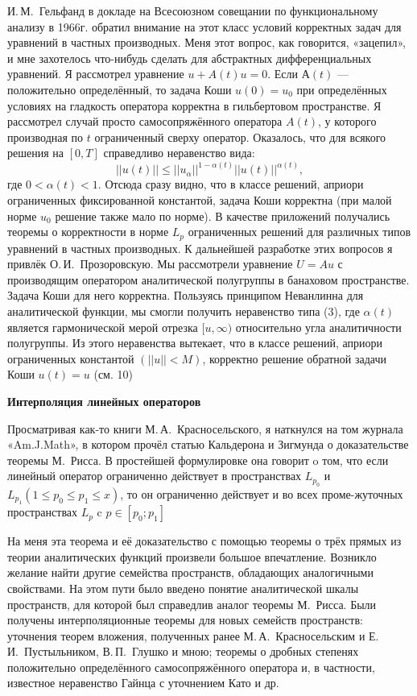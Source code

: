И.\,М.~Гельфанд в докладе на Всесоюзном совещании по функциональному анализу в 1966г. обратил внимание на этот класс условий корректных задач для уравнений в частных производных. Меня этот вопрос, как говорится, «зацепил», и мне захотелось что-нибудь сделать для абстрактных дифференциальных уравнений. Я рассмотрел уравнение $u + A(t)u = 0$. Если $А(t)$ --- положительно определённый, то задача Коши $u(0)=u_0$ при определённых условиях на гладкость оператора корректна в гильбертовом пространстве. Я рассмотрел случай просто самосопряжённого оператора $A(t)$, у которого производная по $t$ ограниченный сверху оператор. Оказалось, что для всякого решения на $[0,T]$ справедливо неравенство вида:
$$||u(t)||\leqslant||u_{\alpha}||^{1-\alpha(t)} ||u(t)||^{\alpha(t)},$$
где $0<\alpha(t) < 1$.
Отсюда сразу видно, что в классе решений, априори ограниченных фиксированной константой,
задача Коши корректна (при малой норме $u_0$ решение также мало по норме).
В качестве приложений получались теоремы о корректности в норме $L_p$
ограниченных решений для различных типов уравнений в частных производных.
К дальнейшей разработке этих вопросов я привлёк О.\,И.~Прозоровскую. Мы рассмотрели уравнение $U = Au$ с производящим оператором аналитической полугруппы в банаховом пространстве. Задача Коши для него корректна. Пользуясь принципом Неванлинна для аналитической функции, мы смогли получить неравенство типа (3), где $\alpha(t)$
является гармонической мерой отрезка $[u, \infty)$  относительно угла аналитичности полугруппы. Из этого неравенства вытекает, что в классе решений, априори ограниченных константой $(||u||<M)$, корректно решение обратной задачи Коши $u(t) = u$ (см. 10)

{\bf Интерполяция линейных операторов}

Просматривая как-то книги М.\,А.~Красносельского, я наткнулся на том журнала «Am.J.Math»,
в котором прочёл статью Кальдерона и Зигмунда о доказательстве теоремы М.~Рисса.
В простейшей формулировке она говорит o том, что если линейный оператор ограниченно действует в пространствах $L_{p_0}$ и  $L_{p_1} (1\leqslant p_0 \leqslant p_1 \leqslant x)$, то он ограниченно действует и во всех проме-жуточных пространствах $L_p$ c $p \in [p_0;p_1]$

На меня эта теорема и её доказательство с помощью теоремы о трёх прямых из теории аналитических функций произвели большое впечатление. Возникло желание найти другие семейства пространств, обладающих аналогичными свойствами. На этом пути было введено понятие аналитической шкалы пространств, для которой был справедлив аналог теоремы М.~Рисса. Были получены интерполяционные теоремы для новых семейств пространств: уточнения теорем вложения, полученных ранее М.\,А.~Красносельским и Е.\,И.~Пустыльником, В.\,П.~Глушко и мною; теоремы о дробных степенях положительно определённого самосопряжённого оператора и, в частности, известное неравенство Гайнца с уточнением Като и др.

